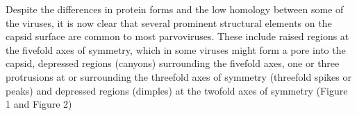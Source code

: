 Despite the differences in protein forms and the low homology between some of the viruses, it is now clear that several prominent structural elements on the capsid surface are common to most parvoviruses. These include raised regions at the fivefold axes of symmetry, which in some viruses might form a pore into the capsid, depressed regions (canyons) surrounding the fivefold axes, one or three protrusions at or surrounding the threefold axes of symmetry (threefold spikes or peaks) and depressed regions (dimples) at the twofold axes of symmetry (Figure 1 and Figure 2) 


\subsection{}





\subsection{}


\subsection{}

\subsection{}
 


\section{}


\subsection{}



\subsection{}

